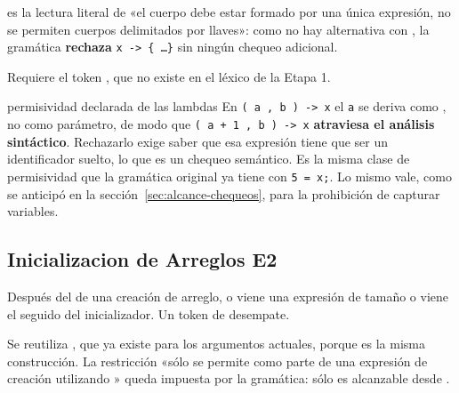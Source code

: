 \begin{producciones}
\end{producciones}
 \deriva{}  es la lectura literal de «el cuerpo debe estar formado
por una única expresión, no se permiten cuerpos delimitados por llaves»: como no hay alternativa
con \tl{\{}, la gramática \textbf{rechaza} \texttt{x -> \{ \dots \}} sin ningún chequeo adicional.

Requiere el token \tl{->}, que no existe en el léxico de la Etapa 1.

\begin{decision}{permisividad declarada de las lambdas}
En \texttt{( a , b ) -> x} el \texttt{a} se deriva como , no como parámetro, de modo
que \texttt{( a + 1 , b ) -> x} \textbf{atraviesa el análisis sintáctico}. Rechazarlo exige saber
que esa expresión tiene que ser un identificador suelto, lo que es un chequeo semántico. Es la
misma clase de permisividad que la gramática original ya tiene con \texttt{5 = x;}. Lo mismo vale,
como se anticipó en la sección~\ref{sec:alcance-chequeos}, para la prohibición de capturar
variables.
\end{decision}

\subsection{Inicializacion de Arreglos E2}

Después del \tl{[} de una creación de arreglo, o viene una expresión de tamaño o viene el \tl{]}
seguido del inicializador. Un token de desempate.
\begin{producciones}
\regla{CreacionDeArreglo}{\tl{[} \nt{RestoCreacionDeArreglo}}
\regla{RestoCreacionDeArreglo}{\nt{Expresion} \tl{]} \nt{DimensionesConTamanioOpcional}}
\regla{RestoCreacionDeArreglo}{\tl{]} \tl{\{} \nt{ListaExpsOpcional} \tl{\}}}
\end{producciones}
Se reutiliza , que ya existe para los argumentos actuales, porque es la misma
construcción. La restricción «sólo se permite como parte de una expresión de creación utilizando
» queda impuesta por la gramática:  sólo es alcanzable desde
.

